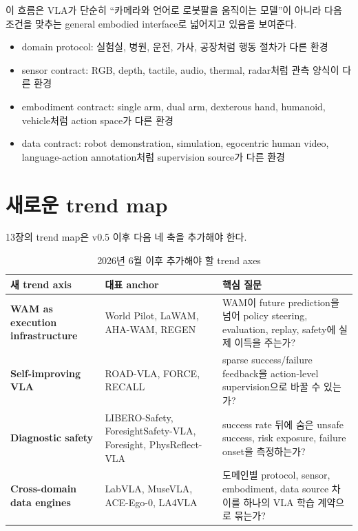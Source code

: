 이 흐름은 VLA가 단순히 ``카메라와 언어로 로봇팔을 움직이는 모델''이 아니라 다음 조건을 맞추는 general embodied interface로 넓어지고 있음을 보여준다.

\begin{itemize}
  \item domain protocol: 실험실, 병원, 운전, 가사, 공장처럼 행동 절차가 다른 환경
  \item sensor contract: RGB, depth, tactile, audio, thermal, radar처럼 관측 양식이 다른 환경
  \item embodiment contract: single arm, dual arm, dexterous hand, humanoid, vehicle처럼 action space가 다른 환경
  \item data contract: robot demonstration, simulation, egocentric human video, language-action annotation처럼 supervision source가 다른 환경
\end{itemize}

\section{새로운 trend map}

13장의 trend map은 v0.5 이후 다음 네 축을 추가해야 한다.

\begin{table}[t]
  \centering
  \small
  \caption{2026년 6월 이후 추가해야 할 trend axes}
  \label{tab:june2026_new_trend_axes}
  \begin{tabularx}{\textwidth}{>{\bfseries}p{33mm}p{42mm}X}
    \toprule
    새 trend axis & 대표 anchor & 핵심 질문 \\
    \midrule
    WAM as execution infrastructure & World Pilot, LaWAM, AHA-WAM, REGEN & WAM이 future prediction을 넘어 policy steering, evaluation, replay, safety에 실제 이득을 주는가? \\
    Self-improving VLA & ROAD-VLA, FORCE, RECALL & sparse success/failure feedback을 action-level supervision으로 바꿀 수 있는가? \\
    Diagnostic safety & LIBERO-Safety, ForesightSafety-VLA, Foresight, PhysReflect-VLA & success rate 뒤에 숨은 unsafe success, risk exposure, failure onset을 측정하는가? \\
    Cross-domain data engines & LabVLA, MuseVLA, ACE-Ego-0, LA4VLA & 도메인별 protocol, sensor, embodiment, data source 차이를 하나의 VLA 학습 계약으로 묶는가? \\
    \bottomrule
  \end{tabularx}
\end{table}

